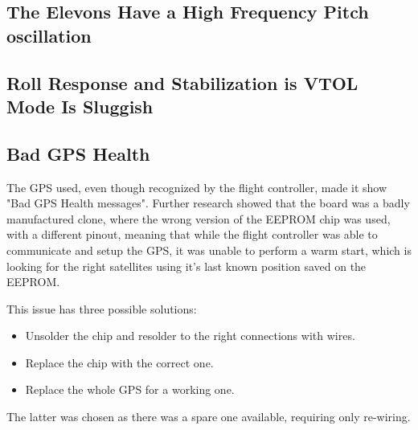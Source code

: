 \subsection{The Elevons Have a High Frequency Pitch oscillation}

\subsection{Roll Response and Stabilization is VTOL Mode Is Sluggish}
\label{sec:sluggish}

\subsection{Bad GPS Health}
The GPS used, even though recognized by the flight controller, made it show "Bad GPS Health messages". Further research showed that the board was a badly manufactured clone\cite{badgps}, where the wrong version of the EEPROM chip was used, with a different pinout, meaning that while the flight controller was able to communicate and setup the GPS, it was unable to perform a warm start, which is looking for the right satellites using it's last known position saved on the EEPROM.

This issue has three possible solutions:
\begin{itemize}
\item Unsolder the chip and resolder to the right connections with wires.
\item Replace the chip with the correct one.
\item Replace the whole GPS for a working one.
\end{itemize}

The latter was chosen as there was a spare one available, requiring only re-wiring.
